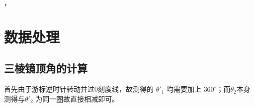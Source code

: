 \documentclass[UTF8]{ctexart}
\begin{document}
，









\section{数据处理}   %


\subsection{三棱镜顶角的计算}

首先由于游标逆时针转动并过0刻度线，故测得的 $\theta'_1$  均需要加上 $360^{\circ}$；而$\theta_2 $本身测得与$\theta'_2 $ 为同一圈故直接相减即可。
\end{document}
